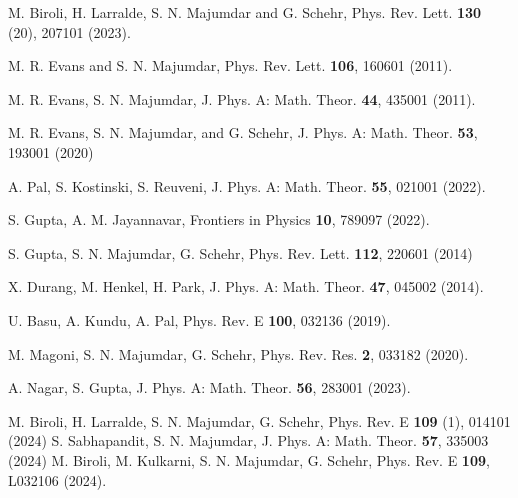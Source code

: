 \documentclass[onecolumn,superscriptaddress,
 amsmath,amssymb,
 aps,
 prd,
]{revtex4-1}
\begin{document}
\begin{thebibliography}{1}
 M. Biroli, H. Larralde, S. N. Majumdar and G. Schehr, Phys. Rev. Lett. {\bf 130} (20), 207101 (2023).

 M. R. Evans and S. N. Majumdar, Phys. Rev. Lett. {\bf 106}, 160601 (2011).

M. R. Evans, S. N. Majumdar, J. Phys. A: Math. Theor. {\bf 44}, 435001 (2011).

 M. R. Evans, S. N. Majumdar, and G. Schehr, J. Phys. A: Math. Theor. {\bf 53}, 193001 (2020)

A. Pal, S. Kostinski, S. Reuveni, J. Phys. A: Math. Theor. {\bf 55}, 021001 (2022).

S. Gupta, A. M. Jayannavar, Frontiers in Physics {\bf 10}, 789097 (2022).





S. Gupta, S. N. Majumdar, G. Schehr, Phys. Rev. Lett. {\bf 112}, 220601 (2014)

X. Durang, M. Henkel, H. Park, J. Phys. A: Math. Theor. {\bf 47}, 045002 (2014).

U. Basu, A. Kundu, A. Pal, Phys. Rev. E {\bf 100}, 032136 (2019).


M. Magoni, S. N. Majumdar, G. Schehr, Phys. Rev. Res. {\bf 2}, 033182 (2020).

A. Nagar, S. Gupta, J. Phys. A: Math. Theor. {\bf 56}, 283001 (2023).






 M. Biroli, H. Larralde, S. N. Majumdar, G. Schehr, Phys. Rev. E {\bf 109} (1), 014101 (2024)
 S. Sabhapandit, S. N. Majumdar, J. Phys. A: Math. Theor. {\bf 57}, 335003 (2024)
 M. Biroli, M. Kulkarni, S. N. Majumdar, G. Schehr,  Phys. Rev. E {\bf 109}, L032106 (2024).



\end{thebibliography}
\end{document}
